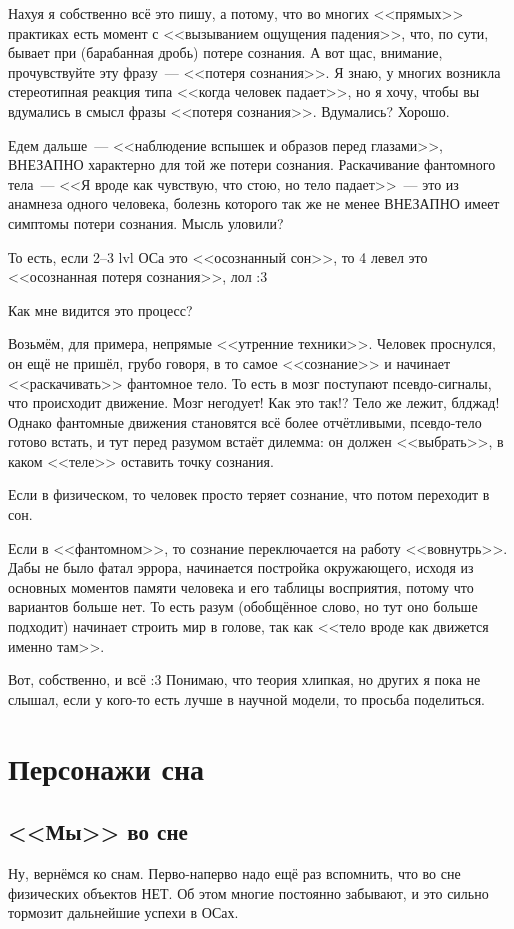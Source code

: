 \documentclass[a5paper,12pt,twoside]{memoir}
\begin{document}
Нахуя я собственно всё это пишу, а потому, что во многих <<прямых>> практиках есть момент с <<вызыванием ощущения падения>>, что, по сути, бывает при (барабанная дробь) потере сознания. А вот щас, внимание, прочувствуйте эту фразу~--- <<потеря сознания>>. Я знаю, у многих возникла стереотипная реакция типа <<когда человек падает>>, но я хочу, чтобы вы вдумались в смысл фразы <<потеря сознания>>. Вдумались? Хорошо.

Едем дальше~--- <<наблюдение вспышек и образов перед глазами>>, ВНЕЗАПНО характерно для той же потери сознания. Раскачивание фантомного тела~--- <<Я вроде как чувствую, что стою, но тело падает>>~--- это из анамнеза одного человека, болезнь которого так же не менее ВНЕЗАПНО имеет симптомы потери сознания. Мысль уловили?

То есть, если 2--3 lvl ОСа это <<осознанный сон>>, то 4 левел это <<осознанная потеря сознания>>, лол :3 

Как мне видится это процесс?

Возьмём, для примера, непрямые <<утренние техники>>. Человек проснулся, он ещё не пришёл, грубо говоря, в то самое <<сознание>> и начинает <<раскачивать>> фантомное тело. То есть в мозг поступают псевдо-сигналы, что происходит движение. Мозг негодует! Как это так!? Тело же лежит, блджад! Однако фантомные движения становятся всё более отчётливыми, псевдо-тело готово встать, и тут перед разумом встаёт дилемма: он должен <<выбрать>>, в каком <<теле>> оставить точку сознания.
 
Если в физическом, то человек просто теряет сознание, что потом переходит в сон.

Если в  <<фантомном>>, то сознание переключается на работу <<вовнутрь>>. Дабы не было фатал эррора, начинается постройка окружающего, исходя из основных моментов памяти человека и его таблицы восприятия, потому что вариантов больше нет. То есть разум (обобщённое слово, но тут оно больше подходит) начинает строить мир в голове, так как <<тело вроде как движется именно там>>.

Вот, собственно, и всё :3 Понимаю, что теория хлипкая, но других я пока не слышал, если у кого-то есть лучше в научной модели, то просьба поделиться.




\chapter{Персонажи сна}

\section{<<Мы>> во сне}
Ну, вернёмся ко снам. Перво-наперво надо ещё раз вспомнить, что во сне физических объектов НЕТ. Об этом многие постоянно забывают, и это сильно тормозит дальнейшие успехи в ОСах. 
\end{document}
